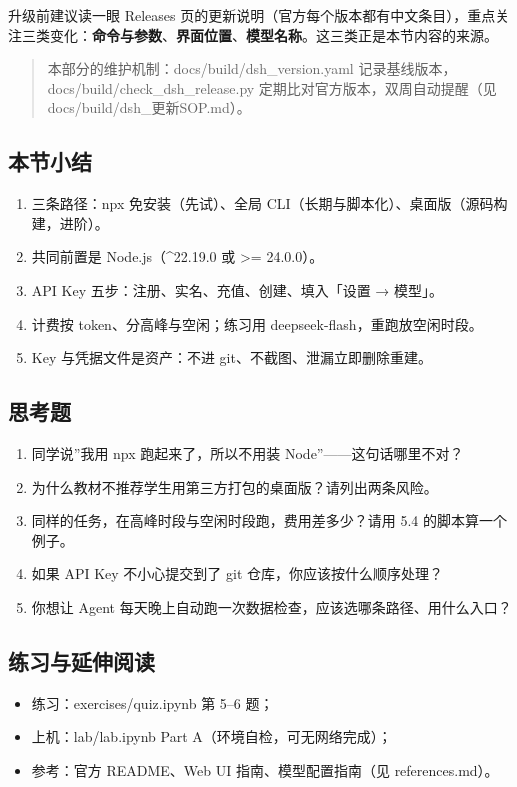 升级前建议读一眼 Releases
页的更新说明（官方每个版本都有中文条目），重点关注三类变化：\textbf{命令与参数}、\textbf{界面位置}、\textbf{模型名称}。这三类正是本节内容的来源。

\begin{quote}
本部分的维护机制：docs/build/dsh\_version.yaml
记录基线版本，docs/build/check\_dsh\_release.py
定期比对官方版本，双周自动提醒（见 docs/build/dsh\_更新SOP.md）。
\end{quote}

\subsection{本节小结}\label{ux672cux8282ux5c0fux7ed3-4}

\begin{enumerate}
\def\labelenumi{\arabic{enumi}.}
\tightlist
\item
  三条路径：npx 免安装（先试）、全局
  CLI（长期与脚本化）、桌面版（源码构建，进阶）。
\item
  共同前置是 Node.js（\^{}22.19.0 或 \textgreater= 24.0.0）。
\item
  API Key 五步：注册、实名、充值、创建、填入「设置 → 模型」。
\item
  计费按 token、分高峰与空闲；练习用 deepseek-flash，重跑放空闲时段。
\item
  Key 与凭据文件是资产：不进 git、不截图、泄漏立即删除重建。
\end{enumerate}

\subsection{思考题}\label{ux601dux8003ux9898-28}

\begin{enumerate}
\def\labelenumi{\arabic{enumi}.}
\tightlist
\item
  同学说''我用 npx 跑起来了，所以不用装 Node''------这句话哪里不对？
\item
  为什么教材不推荐学生用第三方打包的桌面版？请列出两条风险。
\item
  同样的任务，在高峰时段与空闲时段跑，费用差多少？请用 5.4
  的脚本算一个例子。
\item
  如果 API Key 不小心提交到了 git 仓库，你应该按什么顺序处理？
\item
  你想让 Agent 每天晚上自动跑一次数据检查，应该选哪条路径、用什么入口？
\end{enumerate}

\subsection{练习与延伸阅读}\label{ux7ec3ux4e60ux4e0eux5ef6ux4f38ux9605ux8bfb-1}

\begin{itemize}
\tightlist
\item
  练习：exercises/quiz.ipynb 第 5--6 题；
\item
  上机：lab/lab.ipynb Part A（环境自检，可无网络完成）；
\item
  参考：官方 README、Web UI 指南、模型配置指南（见 references.md）。
\end{itemize}

\newpage
